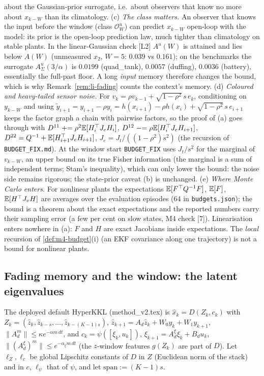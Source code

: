 \begin{remark}
about the Gaussian-prior surrogate, i.e.\ about observers that know no more about $x_{k-W}$ than its climatology.
(c) \emph{The class matters.} An observer that knows the input before the window (class $\mathcal O^u_W$) can
predict $x_{k-W}$ open-loop with the model: its prior is the open-loop prediction law, much tighter than climatology
on stable plants. In the linear-Gaussian check [L2] $A^u(W)$ is attained and lies below $A(W)$ (unmeasured
$x_2$, $W=5$: $0.039$ vs $0.161$); on the benchmarks the surrogate $A^u_\Sigma(3/\alpha)$ is $0.0199$ (quad\_tank),
$0.0057$ (duffing), $0.0036$ (battery), essentially the full-past floor. A long \emph{input} memory therefore changes
the bound, which is why Remark~\ref{rem:li-fading} counts the context's memory.
(d) \emph{Coloured and heavy-tailed sensor noise.} For $v_k=\rho v_{k-1}+\sqrt{1-\rho^2}\,s\,e_k$, conditioning on
$y_{k-W}$ and using $\tilde y_{i+1}=y_{i+1}-\rho y_i=h(x_{i+1})-\rho h(x_i)+\sqrt{1-\rho^2}\,s\,e_{i+1}$ keeps the factor
graph a chain with pairwise factors, so the proof of (a) goes through with
$D^{11}\mathrel{+}=\rho^2\mathbb E[H_i^\top J_eH_i]$, $D^{12}\mathrel{-}=\rho\mathbb E[H_i^\top J_eH_{i+1}]$, $D^{22}=Q^{-1}+\mathbb E[H_{i+1}^\top J_eH_{i+1}]$,
$J_e=J_t/((1-\rho^2)s^2)$ (the recursion of \texttt{BUDGET\_FIX.md}). At the window start \texttt{BUDGET\_FIX} uses
$J_t/s^2$ for the marginal of $v_{k-W}$, an upper bound on its true Fisher information (the marginal is a sum of
independent terms; Stam's inequality), which can only lower the bound: the noise side remains rigorous; the
state-prior caveat (b) is unchanged.
(e) \emph{Where Monte Carlo enters.} For nonlinear plants the expectations $\mathbb E[F^\top Q^{-1}F]$, $\mathbb E[F]$, $\mathbb E[H^\top J_vH]$
are averages over the evaluation episodes (64 in \texttt{budgets.json}); the bound is a theorem about the exact
expectations and the reported numbers carry their sampling error (a few per cent on slow states, M4 check [7]).
Linearisation enters nowhere in (a): $F$ and $H$ are exact Jacobians inside expectations. The \emph{local}
recursion of \ref{def:m4-budget}(i) (an EKF covariance along one trajectory) is not a bound for nonlinear plants.
\end{remark}

\subsection{Fading memory and the window: the latent eigenvalues}

The deployed default HyperKKL (method\_v2.tex) is $\hat x_k=D(Z_k,c_k)$ with
$Z_k=(\hat z_k,\hat z_{k-s},\dots,\hat z_{k-(K-1)s})$, $\hat z_{k+1}=A_d\hat z_k+W_0y_k+W_1y_{k+1}$, $\|A_d^m\|\le\kappa e^{-\alpha m\,dt}$,
and $c_k=\psi([\xi_k,u_k])$, $\xi_{k+1}=A^\xi_d\xi_k+B_du_k$, $\|(A^\xi_d)^m\|\le e^{-\alpha_\xi m\,dt}$ (the $z$-window features
$g(Z_k)$ are part of $D$). Let $\ell_Z,\ell_c$ be global Lipschitz constants of $D$ in $Z$ (Euclidean norm of the
stack) and in $c$, $\ell_\psi$ that of $\psi$, and let $\mathrm{span}:=(K-1)s$.

